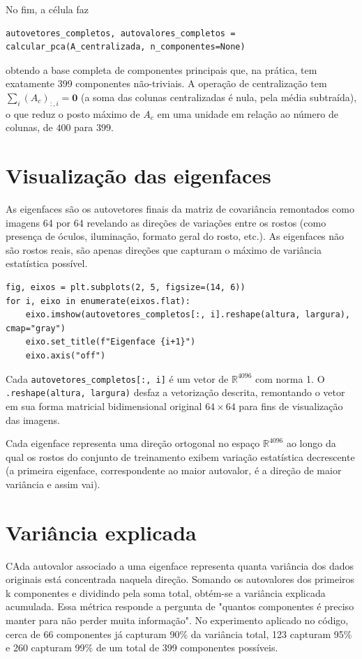 \documentclass[12pt,a4paper]{article}
\begin{document}
No fim, a célula faz

\begin{lstlisting}
autovetores_completos, autovalores_completos = calcular_pca(A_centralizada, n_componentes=None)
\end{lstlisting}

obtendo a base completa de componentes principais que, na prática, tem
exatamente 399 componentes não-triviais. A operação de centralização tem
$\sum_i (A_c)_{:,i} = \mathbf{0}$ (a soma das colunas
centralizadas é nula, pela média subtraída), o que
reduz o posto máximo de $A_c$ em uma unidade em relação ao número de
colunas, de $400$ para $399$.

\section{Visualização das eigenfaces}

As eigenfaces são os autovetores finais da matriz de covariância remontados como imagens 64 por 64 revelando as direções de variações entre os rostos (como presença de óculos, iluminação, formato geral do rosto, etc.). As eigenfaces não são rostos reais, são apenas direções que capturam o máximo de variância estatística possível.

\begin{lstlisting}
fig, eixos = plt.subplots(2, 5, figsize=(14, 6))
for i, eixo in enumerate(eixos.flat):
    eixo.imshow(autovetores_completos[:, i].reshape(altura, largura), cmap="gray")
    eixo.set_title(f"Eigenface {i+1}")
    eixo.axis("off")
\end{lstlisting}

Cada \texttt{autovetores\_completos[:, i]} é um vetor de $\mathbb{R}^{4096}$ com norma 1. O
\texttt{.reshape(altura, largura)} desfaz a vetorização descrita, remontando o
vetor em sua forma matricial bidimensional original $64\times64$ para
fins de visualização das imagens.

Cada eigenface representa uma direção
ortogonal no espaço $\mathbb{R}^{4096}$ ao longo da qual os rostos do conjunto de
treinamento exibem variação estatística decrescente (a primeira eigenface,
correspondente ao maior autovalor, é a direção de maior variância e assim vai).

\section{Variância explicada}

CAda autovalor associado a uma eigenface representa quanta variância dos dados originais está concentrada naquela direção. Somando os autovalores dos primeiros k componentes e dividindo pela soma total, obtém-se a variância explicada acumulada. Essa métrica responde a pergunta de "quantos componentes é preciso manter para não perder muita informação". No experimento aplicado no código, cerca de 66 componentes já capturam 90\% da variância total, 123 capturam 95\% e 260 capturam 99\% de um total de 399 componentes possíveis.
\end{document}
